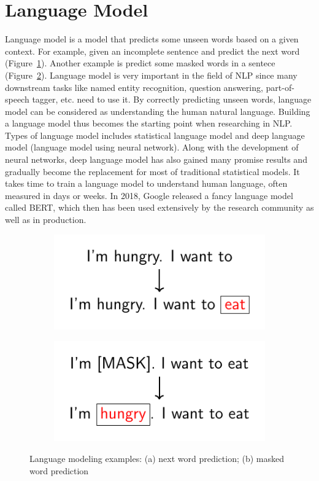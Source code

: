 \documentclass[12pt, sort&compress]{report}
\begin{document}
\section{Language Model}
\label{sec:2.2}
Language model is a model that predicts some unseen words based on a given context. For example, given an incomplete sentence and predict the next word (Figure~\ref{fig:add:01:a}). Another example is predict  some masked words in a sentece (Figure~\ref{fig:add:01:b}). Language model is very important in the field of NLP since many downstream tasks like named entity recognition, question answering, part-of-speech tagger, etc. need to use it. By correctly predicting unseen words, language model can be considered as understanding the human natural language. Building a language model thus becomes the starting point  when researching in NLP. Types of language model includes statistical language model and deep language model (language model using neural network).  Along with the development of neural networks, deep language model has also gained many promise results and gradually become the replacement for most of traditional statistical models. It takes time to train a language model to understand human language, often measured in days or weeks. In 2018, Google released a fancy language model called BERT, which then has been used extensively by the research community as well as in production.
\begin{figure}[!htbp]
	\begin{subfigure}{.5\linewidth}
		\centering
		\includegraphics[scale=1.]{images/PDF/langModel/nextWord.pdf}
		\caption{}
		\label{fig:add:01:a}
	\end{subfigure}
	\begin{subfigure}{.5\linewidth}
		\centering
		\includegraphics[scale=1.]{images/PDF/langModel/maskedWord.pdf}
		\caption{}
		\label{fig:add:01:b}
	\end{subfigure}
	\caption{Language modeling examples: (a) next word prediction; (b) masked word prediction}
	\label{fig:add:01}
\end{figure}
\end{document}
